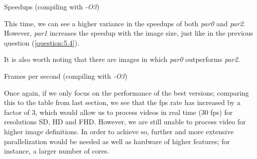 \documentclass{article}
\begin{document}
\begin{table}[h]
    
    \centering
    \caption{Speedups (compiling with \emph{-O3})}
\end{table}

This time, we can see a higher variance in the speedups of both \emph{par0} and \emph{par2}. However, \emph{par1} increases the speedup with the image size, just like in the previous question (\ref{question:5.4}).

It is also worth noting that there are images in which \emph{par0} outperforms \emph{par2}.

\begin{table}[h]
    
    \centering
    \caption{Frames per second (compiling with \emph{-O3})}
    \label{fps2}
\end{table}

Once again, if we only focus on the performance of the best versions; comparing this to the table from last section, we see that the fps rate has increased by a factor of 3, which would allow us to process videos in real time (30 fps) for resolutions SD, HD and FHD. However, we are still unable to process video for higher image definitions. In order to achieve so, further and more extensive parallelization would be needed as well as hardware of higher features; for instance, a larger number of cores.
\end{document}
